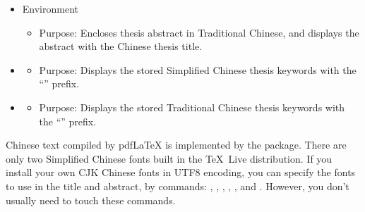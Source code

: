 \begin{itemize}[noitemsep]
\item Environment 
\begin{itemize}[noitemsep]
  \item \textsf{Purpose:} Encloses thesis abstract in Traditional Chinese, and displays the abstract with the Chinese thesis title.
\end{itemize}

\item {}
\begin{itemize}[noitemsep]
  \item \textsf{Purpose:} Displays the stored Simplified Chinese thesis keywords with the ``'' prefix.
\end{itemize}

\item {}
\begin{itemize}[noitemsep]
  \item \textsf{Purpose:} Displays the stored Traditional Chinese thesis keywords with the ``'' prefix.
\end{itemize}
\end{itemize}

Chinese text compiled by {pdf\LaTeX} is implemented by the  package.
There are only two Simplified Chinese fonts built in the \TeX\ Live distribution.
If you install your own CJK Chinese fonts in UTF8 encoding, you can specify the fonts to use in the title and abstract,
by commands: , , , , , and .
However, you don't usually need to touch these commands.

